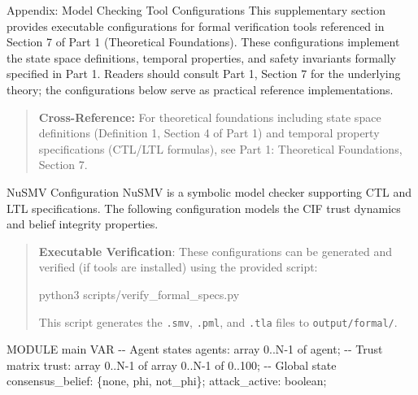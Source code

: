 \documentclass[
  ignorenonframetext,
]{beamer}
\author{\texorpdfstring{}{}}
\date{}
\newenvironment{Shaded}{}{}
\newcommand{\ExtensionTok}[1]{#1}
\newcommand{\NormalTok}[1]{#1}
\newcounter{none} %
\begin{document}
\begin{frame}[fragile]{Appendix: Model Checking Tool Configurations}
\protect{}\label{sec:model-checking-tools}
This supplementary section provides executable configurations for formal
verification tools referenced in Section 7 of Part 1 (Theoretical
Foundations). These configurations implement the state space
definitions, temporal properties, and safety invariants formally
specified in Part 1. Readers should consult Part 1, Section 7 for the
underlying theory; the configurations below serve as practical reference
implementations.

\begin{quote}
\textbf{Cross-Reference:} For theoretical foundations including state
space definitions (Definition 1, Section 4 of Part 1) and temporal
property specifications (CTL/LTL formulas), see Part 1: Theoretical
Foundations, Section 7.
\end{quote}

\begin{block}{NuSMV Configuration}
\protect{}\label{sec:nusmv-config}
NuSMV is a symbolic model checker supporting CTL and LTL specifications.
The following configuration models the CIF trust dynamics and belief
integrity properties.

\begin{quote}
\textbf{Executable Verification}: These configurations can be generated
and verified (if tools are installed) using the provided script:

\begin{Shaded}
\begin{Highlighting}[]
\ExtensionTok{python3}\NormalTok{ scripts/verify\_formal\_specs.py}
\end{Highlighting}
\end{Shaded}

This script generates the \texttt{.smv}, \texttt{.pml}, and
\texttt{.tla} files to \texttt{output/formal/}.
\end{quote}

\begin{Shaded}
\begin{Highlighting}[]
\NormalTok{MODULE main}
\NormalTok{VAR}
\NormalTok{  {-}{-} Agent states}
\NormalTok{  agents: array 0..N{-}1 of agent;}
\NormalTok{  {-}{-} Trust matrix}
\NormalTok{  trust: array 0..N{-}1 of array 0..N{-}1 of 0..100;}
\NormalTok{  {-}{-} Global state}
\NormalTok{  consensus\_belief: \{none, phi, not\_phi\};}
\NormalTok{  attack\_active: boolean;}


\end{Highlighting}
\end{Shaded}
\end{block}
\end{frame}
\end{document}

